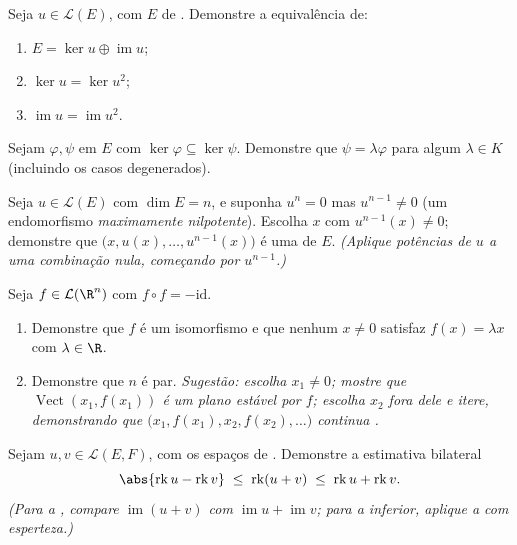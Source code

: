 \begin{exercise}[$\star\star$]\label{exo:b1:linmaps:7}
Seja $u \in \mathcal{L}(E)$, com $E$ de . Demonstre a equivalência
de:
\begin{enumerate}
  \item $E = \ker u \oplus \operatorname{im} u$;
  \item $\ker u = \ker u^2$;
  \item $\operatorname{im} u = \operatorname{im} u^2$.
\end{enumerate}
\end{exercise}

\begin{exercise}[$\star\star$]\label{exo:b1:linmaps:8}
Sejam $\varphi, \psi$  em $E$ com $\ker\varphi
\subseteq \ker\psi$. Demonstre que $\psi = \lambda\varphi$
para algum $\lambda \in K$ (incluindo os casos degenerados).
\end{exercise}

\begin{exercise}[$\star\star\star$]\label{exo:b1:linmaps:9}
Seja $u \in \mathcal{L}(E)$ com $\dim E = n$, e suponha $u^n = 0$ mas $u^{n-1} \neq 0$ (um
endomorfismo \emph{maximamente nilpotente}). Escolha $x$ com $u^{n-1}(x) \neq 0$;
demonstre que $\bigl(x, u(x), \dots,
u^{n-1}(x)\bigr)$ é uma  de $E$. \emph{(Aplique potências de
$u$ a uma combinação nula, começando por $u^{n-1}$.)}
\end{exercise}

\begin{exercise}[$\star\star\star$]\label{exo:b1:linmaps:10}
Seja $f \in \mathcal{L}(\R^n)$ com $f \circ f = -\mathrm{id}$.
\begin{enumerate}
  \item Demonstre que $f$ é um isomorfismo e que nenhum $x \neq 0$
        satisfaz $f(x) = \lambda x$ com $\lambda \in \R$.
  \item Demonstre que $n$ é par. \emph{Sugestão: escolha $x_1 \neq 0$;
        mostre que $\operatorname{Vect}(x_1, f(x_1))$ é um plano estável por $f$; escolha $x_2$
        fora dele e itere, demonstrando que $\bigl(x_1, f(x_1), x_2, f(x_2), \dots\bigr)$ continua .}
\end{enumerate}
\end{exercise}

\begin{exercise}[$\star\star$]\label{exo:b1:linmaps:11}
Sejam $u, v \in \mathcal{L}(E, F)$, com os espaços de . Demonstre a
estimativa bilateral
\[
\abs{\operatorname{rk} u - \operatorname{rk} v}
\;\leq\; \operatorname{rk}(u + v)
\;\leq\; \operatorname{rk} u + \operatorname{rk} v .
\]
\emph{(Para a , compare $\operatorname{im}(u+v)$ com $\operatorname{im} u + \operatorname{im} v$; para a
inferior, aplique a  com esperteza.)}
\end{exercise}

